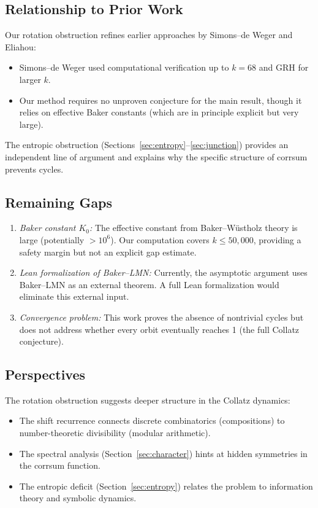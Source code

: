 \documentclass[12pt,a4paper]{amsart}
\theoremstyle{plain}
\theoremstyle{definition}
\begin{document}
\subsection{Relationship to Prior Work}

Our rotation obstruction refines earlier approaches by Simons--de Weger and Eliahou:
\begin{itemize}
\item Simons--de Weger used computational verification up to $k = 68$ and GRH for larger $k$.
\item Our method requires no unproven conjecture for the main result, though it relies on effective Baker constants (which are in principle explicit but very large).
\end{itemize}

The entropic obstruction (Sections~\ref{sec:entropy}--\ref{sec:junction}) provides an independent line of argument and explains why the specific structure of corrsum prevents cycles.

\subsection{Remaining Gaps}

\begin{enumerate}
\item \emph{Baker constant $K_0$:} The effective constant from Baker--Wüstholz theory is large (potentially $> 10^6$). Our computation covers $k \leq 50{,}000$, providing a safety margin but not an explicit gap estimate.

\item \emph{Lean formalization of Baker--LMN:} Currently, the asymptotic argument uses Baker--LMN as an external theorem. A full Lean formalization would eliminate this external input.

\item \emph{Convergence problem:} This work proves the absence of nontrivial cycles but does not address whether every orbit eventually reaches 1 (the full Collatz conjecture).
\end{enumerate}

\subsection{Perspectives}

The rotation obstruction suggests deeper structure in the Collatz dynamics:
\begin{itemize}
\item The shift recurrence connects discrete combinatorics (compositions) to number-theoretic divisibility (modular arithmetic).
\item The spectral analysis (Section~\ref{sec:character}) hints at hidden symmetries in the corrsum function.
\item The entropic deficit (Section~\ref{sec:entropy}) relates the problem to information theory and symbolic dynamics.
\end{itemize}
\end{document}
